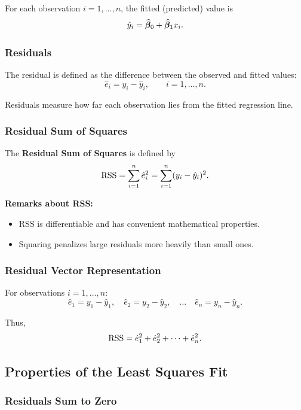 For each observation $i = 1, \dots, n$, the fitted (predicted) value is
\[
\hat{y}_i = \widehat{\boldsymbol{\beta}}_0 + \widehat{\boldsymbol{\beta}}_1 x_i.
\]

\subsubsection*{Residuals}

The residual is defined as the difference between the observed and fitted values:
\[
\hat{e}_i = y_i - \hat{y}_i, \qquad i = 1, \dots, n.
\]

Residuals measure how far each observation lies from the fitted regression line.

\subsubsection*{Residual Sum of Squares}

\begin{keyresult}
The \textbf{Residual Sum of Squares} is defined by
\[
\mathrm{RSS}
=
\sum_{i=1}^n \hat{e}_i^2
=
\sum_{i=1}^n (y_i - \hat{y}_i)^2.
\]
\end{keyresult}

\begin{notebox}
\textbf{Remarks about RSS:}
\begin{itemize}
    \item RSS is differentiable and has convenient mathematical properties.
    \item Squaring penalizes large residuals more heavily than small ones.
\end{itemize}
\end{notebox}

\subsubsection*{Residual Vector Representation}

For observations $i = 1, \dots, n$:
\[
\hat{e}_1 = y_1 - \hat{y}_1,
\quad
\hat{e}_2 = y_2 - \hat{y}_2,
\quad \dots \quad
\hat{e}_n = y_n - \hat{y}_n.
\]

Thus,
\[
\mathrm{RSS}
=
\hat{e}_1^2 + \hat{e}_2^2 + \cdots + \hat{e}_n^2.
\]

\subsection{Properties of the Least Squares Fit}

\subsubsection*{Residuals Sum to Zero}

